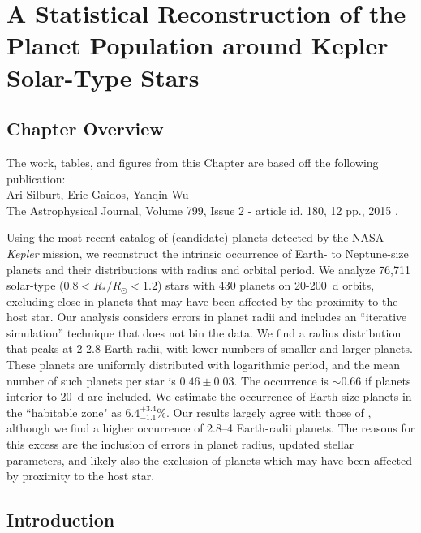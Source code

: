 \chapter[Statistical Reconstruction of Kepler Planets]{A Statistical Reconstruction of the Planet Population around Kepler Solar-Type Stars}
\label{chap:Stats}

\section{Chapter Overview}
	\begin{center}
	\begin{minipage}[c]{4.75in}
	The work, tables, and figures from this Chapter are based off the following publication:\\
	
	Ari Silburt, Eric Gaidos, Yanqin Wu\\
	The Astrophysical Journal, Volume 799, Issue 2 - article id. 180, 12 pp., 2015 \citep{Silburt2015}.
	\vspace{2em}
	\end{minipage}
	\end{center}

Using the most recent catalog of (candidate) planets detected by the
NASA {\it Kepler} mission, we reconstruct the intrinsic occurrence of Earth- to
Neptune-size planets and their distributions with radius and orbital
period.  We analyze 76,711 solar-type ($0.8<R_*/R_{\odot}<1.2 $) stars with 430 planets 
on 20-200~d orbits, excluding close-in planets that may have been affected by
the proximity to the host star.  Our analysis considers errors in
planet radii and includes an ``iterative simulation'' technique that
does not bin the data.  We find a radius distribution that peaks at
2-2.8 Earth radii, with lower numbers of smaller and larger planets.
These planets are uniformly distributed with logarithmic period, and
the mean number of such planets per star is $0.46 \pm 0.03$.  The
occurrence is $\sim 0.66$ if planets interior to 20~d are included.  We
estimate the occurrence of Earth-size planets in the ``habitable zone"
as $6.4^{+3.4}_{-1.1} \%$.  Our results largely agree with those of \cite{Petigura2013}, 
although we find a higher occurrence of 2.8--4
Earth-radii planets. The reasons for this excess are the inclusion of errors in 
planet radius, updated \cite{Huber2014} stellar parameters, and likely also the 
exclusion of planets which may have been affected by proximity to the host star.

\section{Introduction}
\label{sec:introduction}

